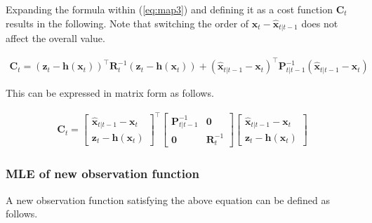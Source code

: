 \documentclass[10pt]{article}
\begin{document}
Expanding the formula within (\ref{eq:map3}) and defining it as a cost function $\mathbf{C}_{t}$ results in the following. Note that switching the order of $\mathbf{x}_{t}  - \hat{\mathbf{x}}_{t|t-1}$ does not affect the overall value.

\begin{equation} 
	\begin{aligned} 
		\mathbf{C}_{t} = (\mathbf{z}_{t} - \mathbf{h}(\mathbf{x}_{t}))^{\intercal} \mathbf{R}_{t}^{-1} (\mathbf{z}_{t} - \mathbf{h}(\mathbf{x}_{t})) + ( \hat{\mathbf{x}}_{t|t-1}  - \mathbf{x}_{t} )^{\intercal} \mathbf{P}^{-1}_{t|t-1} ( \hat{\mathbf{x}}_{t|t-1}  - \mathbf{x}_{t} )
	\end{aligned} 
\end{equation}

This can be expressed in matrix form as follows.

\begin{equation} \label{eq:map4}
	\begin{aligned} 
		\mathbf{C}_{t} = \begin{bmatrix}   \hat{\mathbf{x}}_{t|t-1} - \mathbf{x}_{t}  \\ \mathbf{z}_{t} - \mathbf{h}(\mathbf{x}_{t})\end{bmatrix}^{\intercal} \begin{bmatrix} \mathbf{P}^{-1}_{t|t-1} & \mathbf{0} \\ \mathbf{0} & \mathbf{R}^{-1}_{t} \end{bmatrix} \begin{bmatrix}   \hat{\mathbf{x}}_{t|t-1}  - \mathbf{x}_{t}  \\ \mathbf{z}_{t} - \mathbf{h}(\mathbf{x}_{t})\end{bmatrix}
	\end{aligned} 
\end{equation}

\subsubsection{MLE of new observation function}
A new observation function satisfying the above equation can be defined as follows.
\end{document}
